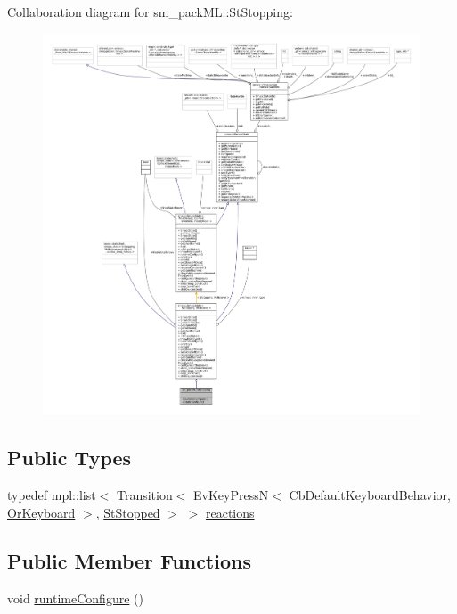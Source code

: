 Collaboration diagram for sm\+\_\+pack\+ML\+:\+:St\+Stopping\+:
\nopagebreak
\begin{figure}[H]
\begin{center}
\leavevmode
\includegraphics[width=350pt]{structsm__packML_1_1StStopping__coll__graph}
\end{center}
\end{figure}
\subsection*{Public Types}
\begin{DoxyCompactItemize}
\item 
typedef mpl\+::list$<$ Transition$<$ Ev\+Key\+PressN$<$ Cb\+Default\+Keyboard\+Behavior, \hyperlink{classsm__packML_1_1OrKeyboard}{Or\+Keyboard} $>$, \hyperlink{structsm__packML_1_1StStopped}{St\+Stopped} $>$ $>$ \hyperlink{structsm__packML_1_1StStopping_ade7d68af33bb4b9672601e4bb01a0bae}{reactions}
\end{DoxyCompactItemize}
\subsection*{Public Member Functions}
\begin{DoxyCompactItemize}
\item 
void \hyperlink{structsm__packML_1_1StStopping_a806226c89b297d619906049ff04df11f}{runtime\+Configure} ()
\end{DoxyCompactItemize}
